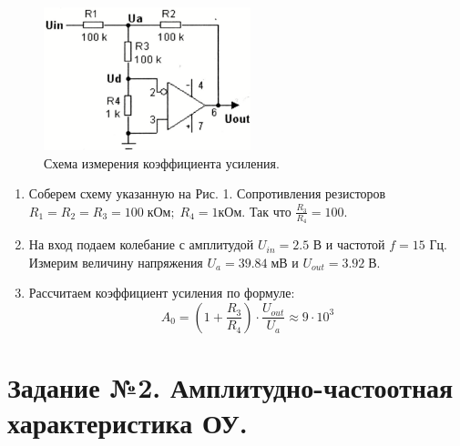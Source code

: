 \documentclass[a4paper]{article}
\begin{document}
    \begin{figure}[H]
        \begin{center}
        \includegraphics[width=6cm]{задание_1.png}
        \caption{Схема измерения коэффициента усиления.}
        \label{2} %
        \end{center}
    \end{figure}
    
    
\begin{enumerate}
    \item Соберем схему указанную на Рис. 1. Сопротивления резисторов $R_1 = R_2 = R_3 = 100 \; кОм ; \; R_4 = 1кОм$. Так что $\frac{R_3}{R_4} = 100$. 
    \item На вход подаем колебание с амплитудой $U_{in} = 2.5$ В и частотой $f = 15$ Гц. Измерим величину напряжения $U_a = 39.84 \;мВ$ и $ U_{out} = 3.92 \; В$.
    \item Рассчитаем коэффициент усиления по формуле:
    \begin{equation}
       A_0 = (1+\frac{R_3}{R_4})\cdot \frac{U_{out}}{U_a} \approx 9 \cdot 10^3
    \end{equation}

\end{enumerate}

\section{Задание №2. Амплитудно-частоотная характеристика ОУ.}

\end{document}
